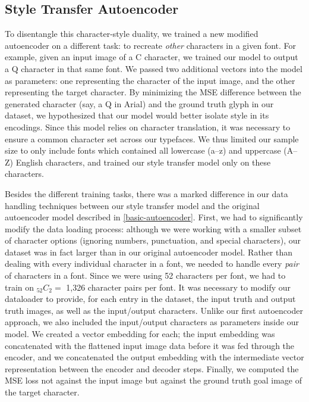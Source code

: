 \subsection{Style Transfer Autoencoder} \label{style-transfer}

To disentangle this character-style duality, we trained a new modified autoencoder on a different task: to recreate \textit{other} characters in a given font. For example, given an input image of a C character, we trained our model to output a Q character in that same font. We passed two additional vectors into the model as parameters: one representing the character of the input image, and the other representing the target character. By minimizing the MSE difference between the generated character (say, a { Q} in Arial) and the ground truth glyph in our dataset, we hypothesized that our model would better isolate style in its encodings. Since this model relies on character translation, it was necessary to ensure a common character set across our typefaces. We thus limited our sample size to only include fonts which contained all lowercase (a–z) and uppercase (A–Z) English characters, and trained our style transfer model only on these characters.

Besides the different training tasks, there was a marked difference in our data handling techniques between our style transfer model and the original autoencoder model described in \ref{basic-autoencoder}. First, we had to significantly modify the data loading process: although we were working with a smaller subset of character options (ignoring numbers, punctuation, and special characters), our dataset was in fact larger than in our original autoencoder model. Rather than dealing with every individual character in a font, we needed to handle every \textit{pair} of characters in a font. Since we were using 52 characters per font, we had to train on ${}_{52}C_2 =$ 1,326 character pairs per font. It was necessary to modify our dataloader to provide, for each entry in the dataset, the input truth and output truth images, as well as the input/output characters. Unlike our first autoencoder approach, we also included the input/output characters as parameters inside our model. We created a vector embedding for each; the input embedding was concatenated with the flattened input image data before it was fed through the encoder, and we concatenated the output embedding with the intermediate vector representation between the encoder and decoder steps. Finally, we computed the MSE loss not against the input image but against the ground truth goal image of the target character.

